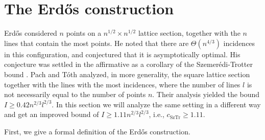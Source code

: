 \documentclass[11pt]{article}
\newcommand\erdos{{Erd{\H o}s}\xspace}
\newcommand\szemeredi{{Szemer\'edi}\xspace}
\newcommand\cst{c_{\mathrm{SzTr}}}
\begin{document}
\section{The \erdos construction}
\erdos \cite{Er-points-lines} considered $n$ points on a
$n^{1/2} \times n^{1/2}$ lattice section, together with the $n$ lines that
contain the most points.
He noted that there are $\Theta(n^{4/3})$ incidences in this configuration, and
conjectured that it is asymptotically optimal.
His conjecture was settled in the affirmative as a corollary of the
\szemeredi-Trotter bound \cite{ST}.
Pach and T\'oth \cite{PT} analyzed, in more generality, the square lattice
section together with the lines with the most incidences, where the number of
lines $l$ is not necessarily equal to the number of points $n$.
Their analysis yielded the bound $I \ge 0.42n^{2/3}l^{2/3}$.
In this section we will analyze the same setting in a different way and get an
improved bound of $I \ge 1.11n^{2/3}l^{2/3}$, i.e., $\cst \ge 1.11$.

First, we give a formal definition of the \erdos construction.
\end{document}
